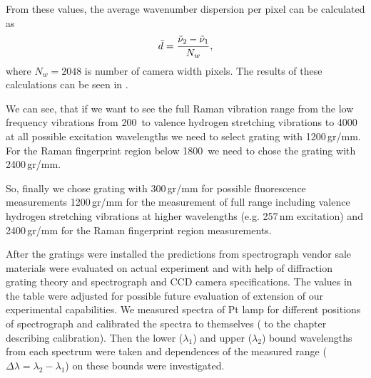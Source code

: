 From these values, the average wavenumber dispersion per pixel can be
calculated as
\begin{equation}
	\bar{d} = \frac{\tilde{\nu}_2 - \tilde{\nu}_1}{N_w},
	\label{\eqnlabel{spectrograph_selection:dispersion_est}}
\end{equation}
where $N_w = 2048$ is number of camera width pixels. The results of these
calculations can be seen in
.

\begin{table}
	\centering
	
	\caption{Spectrograph dispersion estimation. Gratings are denoted by number
		of grooves per mm, $\tilde{\nu}_1$ and $\tilde{\nu}_2$ are lowest and
		highest detected frequencies in \icm calculated according to
		\cref{%
			\eqnlabel{spectrograph_selection:spectral_range_max_est},%
			\eqnlabel{spectrograph_selection:spectral_range_min_est}%
		},
		respectively. The $\bar{d}$ denotes average dispersion in \icm/px
		calculated from
		.}
	\label{\tablabel{spectrograph_selection:dispersion_est}}
\end{table}

We can see, that if we want to see the full Raman vibration range from the
low frequency vibrations from 200\,\icm{} to valence hydrogen stretching
vibrations to 4000\,\icm{} at all possible excitation wavelengths we need to
select grating with 1200\,gr/mm. For the Raman fingerprint region below
1800\,\icm{} we need to chose the grating with 2400\,gr/mm.

So, finally we chose grating with 300\,gr/mm for possible fluorescence
measurements 1200\,gr/mm for the measurement of full range including valence
hydrogen stretching vibrations at higher wavelengths (e.g. 257\,nm excitation)
and 2400\,gr/mm for the Raman fingerprint region measurements.

After the gratings were installed the predictions from spectrograph vendor
sale materials were evaluated on actual experiment and with help of
diffraction grating theory and spectrograph and CCD camera specifications.
The values in the table were adjusted for possible future evaluation of
extension of our experimental capabilities. We measured spectra of Pt lamp for
different positions of spectrograph and calibrated the spectra to themselves
(\REFERENCE{} to the chapter describing calibration).
Then the lower ($\lambda_1$) and upper ($\lambda_2$) bound wavelengths from
each spectrum were taken and dependences of the measured range
($\Delta\lambda = \lambda_2 - \lambda_1$)
on these bounds were investigated.

